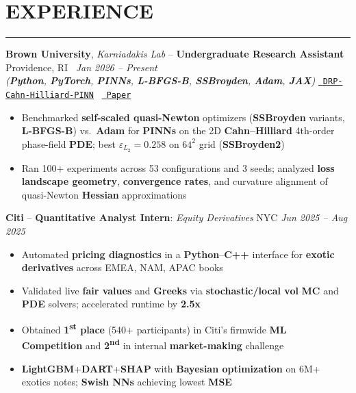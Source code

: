 \documentclass[10.5pt]{article}
\begin{document}
\section*{\fontsize{11.5pt}{13pt}\selectfont\bfseries\MakeUppercase EXPERIENCE}
\vspace{2pt}
\hrule
\vspace{1pt}
\textbf{Brown University}, \textit{Karniadakis Lab} -- \textbf{Undergraduate Research Assistant} \hfill Providence, RI \textbar\ \textit{Jan 2026 -- Present} \\
\textit{(\textbf{Python}, \textbf{PyTorch}, \textbf{PINNs}, \textbf{L-BFGS-B}, \textbf{SSBroyden}, \textbf{Adam}, \textbf{JAX})} \hfill \href{https://github.com/eugenio-macias/DRP-Cahn-Hilliard-PINN}{\faGithub\ \texttt{DRP-Cahn-Hilliard-PINN}} \textbar\ \href{https://eugenio-macias.github.io/DRP_paper.pdf}{\faFilePdf\ \texttt{Paper}} \vspace{-7pt}
\begin{itemize}
  \item Benchmarked \textbf{self-scaled quasi-Newton} optimizers (\textbf{SSBroyden} variants, \textbf{L-BFGS-B}) vs.\ \textbf{Adam} for \textbf{PINNs} on the 2D \textbf{Cahn--Hilliard} 4th-order phase-field \textbf{PDE}; best $\varepsilon_{L_2} = 0.258$ on $64^2$ grid (\textbf{SSBroyden2})
  \item Ran 100+ experiments across 53 configurations and 3 seeds; analyzed \textbf{loss landscape geometry}, \textbf{convergence rates}, and curvature alignment of quasi-Newton \textbf{Hessian} approximations
\end{itemize}
\textbf{Citi} -- \textbf{Quantitative Analyst Intern}: \textit{Equity Derivatives} \hfill NYC \textbar \textit{Jun 2025 -- Aug 2025} \vspace{-7pt}
\begin{itemize}
  \item Automated \textbf{pricing diagnostics} in a \textbf{Python}--\textbf{C++} interface for \textbf{exotic derivatives} across EMEA, NAM, APAC books
  \item Validated live \textbf{fair values} and \textbf{Greeks} via \textbf{stochastic/local vol} \textbf{MC} and \textbf{PDE} solvers; accelerated runtime by \textbf{2.5x}
  \item Obtained \textbf{1\textsuperscript{st} place} (540+ participants) in Citi's firmwide \textbf{ML Competition} and \textbf{2\textsuperscript{nd}} in internal \textbf{market-making} challenge
  \item \textbf{LightGBM}+\textbf{DART}+\textbf{SHAP} with \textbf{Bayesian optimization} on 6M+ exotics notes; \textbf{Swish NNs} achieving lowest \textbf{MSE}
\end{itemize}
\end{document}
